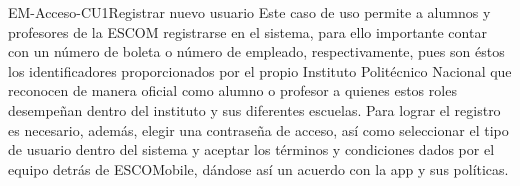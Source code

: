 


	\begin{UseCase}{EM-Acceso-CU1}{Registrar nuevo usuario}{
			\noindent
			Este caso de uso permite a alumnos y profesores de la ESCOM registrarse en el sistema, para ello importante contar con un número de boleta o número de empleado, respectivamente, pues son éstos los identificadores proporcionados por el propio Instituto Politécnico Nacional que reconocen de manera oficial como alumno o profesor a quienes estos roles desempeñan dentro del instituto y sus diferentes escuelas. 
			\noindent
			Para lograr el registro es necesario, además, elegir una contraseña de acceso, así como seleccionar el tipo de usuario dentro del sistema y aceptar los términos y condiciones dados por el equipo detrás de ESCOMobile, dándose así un acuerdo con la app y sus políticas.
			\newline 
		}




\end{UseCase}
